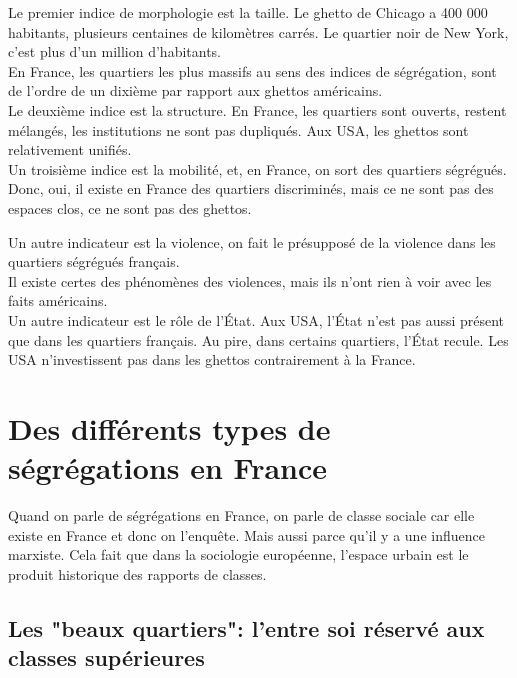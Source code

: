 \documentclass[12pt, a4paper, openany]{book}
\begin{document}
Le premier indice de morphologie est la taille. Le ghetto de Chicago a 400 000 habitants, plusieurs centaines de kilomètres carrés. Le quartier noir de New York, c'est plus d'un million d'habitants. \\
En France, les quartiers les plus massifs au sens des indices de ségrégation, sont de l'ordre de un dixième par rapport aux ghettos américains. \\
Le deuxième indice est la structure. En France, les quartiers sont ouverts, restent mélangés, les institutions ne sont pas dupliqués. Aux USA, les ghettos sont relativement unifiés. \\
Un troisième indice est la mobilité, et, en France, on sort des quartiers ségrégués. \\
Donc, oui, il existe en France des quartiers discriminés, mais ce ne sont pas des espaces clos, ce ne sont pas des ghettos.


Un autre indicateur est la violence, on fait le présupposé de la violence dans les quartiers ségrégués français. \\
Il existe certes des phénomènes des violences, mais ils n'ont rien à voir avec les faits américains. \\
Un autre indicateur est le rôle de l'État. Aux USA, l'État n'est pas aussi présent que dans les quartiers français. Au pire, dans certains quartiers, l'État recule. Les USA n'investissent pas dans les ghettos contrairement à la France. 


\section{Des différents types de ségrégations en France}

Quand on parle de ségrégations en France, on parle de classe sociale car elle existe en France et donc on l'enquête. Mais aussi parce qu'il y a une influence marxiste. Cela fait que dans la sociologie européenne, l'espace urbain est le produit historique des rapports de classes. \\

\subsection{Les "beaux quartiers": l'entre soi réservé aux classes supérieures}
\end{document}
